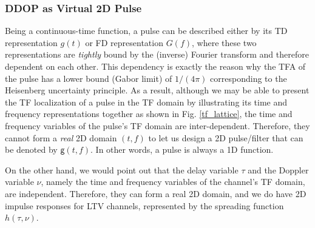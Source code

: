 \documentclass[journal]{IEEEtran}
\begin{document}
\subsubsection{DDOP as Virtual 2D Pulse}\label{2dpulse}

Being a continuous-time function,
a pulse can be described either by its TD representation $g(t)$ or FD representation $G(f)$, where these two representations are \emph{tightly} bound by the (inverse) Fourier transform and therefore dependent on each other. This dependency is exactly the reason why the {TFA of the pulse} has a lower bound (Gabor limit) of $1/(4\pi)$ corresponding to the Heisenberg uncertainty principle. As a result, although we may be able to present {the TF localization of a pulse} in the TF domain by illustrating its time and frequency representations together as shown in Fig. \ref{tf_lattice}, the time and frequency variables of the pulse's TF domain are inter-dependent. Therefore, they  cannot form a \emph{real} 2D domain $(t,f)$ to let us design a 2D pulse/filter that can be denoted by $\mathsf g(t,f)$. {In other words, a pulse is always a 1D function.}

On the other hand, we would point out that the delay variable $\tau$ and the Doppler variable $\nu$, namely the time and frequency variables of the channel's TF domain, are independent. Therefore, they can form a real 2D domain, and we do have 2D impulse responses for LTV channels, represented by the spreading function $h(\tau, \nu)$.
\end{document}
